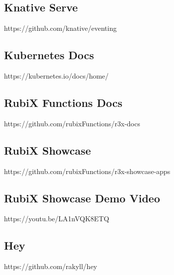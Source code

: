 \documentclass{article}
\begin{document}
\subsection{Knative Serve}
\label{appendix:serve}
https://github.com/knative/eventing

\subsection{Kubernetes Docs}
\label{appendix:k8}
https://kubernetes.io/docs/home/

\subsection{RubiX Functions Docs}
\label{appendix:r3x}
https://github.com/rubixFunctions/r3x-docs

\subsection{RubiX Showcase}
\label{appendix:r3xshow}
https://github.com/rubixFunctions/r3x-showcase-apps

\subsection{RubiX Showcase Demo Video}
\label{appendix:r3xdemo}
https://youtu.be/LA1nVQK8ETQ

\subsection{Hey}
\label{appendix:hey}
https://github.com/rakyll/hey
\end{document}
